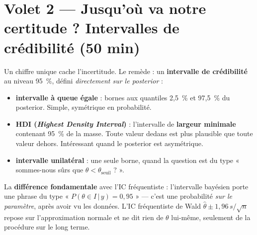 \documentclass[11pt,a4paper]{article}
\newcommand{\given}{\,\vert\,}
\begin{document}
\section{Volet 2 --- Jusqu'où va notre certitude ? Intervalles de crédibilité (50 min)}

\begin{rappel}
Un chiffre unique cache l'incertitude. Le remède : un \textbf{intervalle de
crédibilité} au niveau 95~\%, défini \emph{directement sur le posterior} :
\begin{itemize}[leftmargin=4mm, itemsep=0.5mm]
  \item \textbf{intervalle à queue égale} : bornes aux quantiles 2,5~\% et
        97,5~\% du posterior. Simple, symétrique en probabilité.
  \item \textbf{HDI (\emph{Highest Density Interval})} : l'intervalle de
        \textbf{largeur minimale} contenant 95~\% de la masse. Toute valeur
        dedans est plus plausible que toute valeur dehors. Intéressant quand
        le posterior est asymétrique.
  \item \textbf{intervalle unilatéral} : une seule borne, quand la question est
        du type « sommes-nous sûrs que $\theta < \theta_{\text{seuil}}$ ? ».
\end{itemize}
La \textbf{différence fondamentale} avec l'IC fréquentiste : l'intervalle
bayésien porte une phrase du type « $P(\theta \in I \given y) = 0{,}95$ » ---
c'est une probabilité \emph{sur le paramètre}, après avoir vu les données.
L'IC fréquentiste de Wald $\hat\theta \pm 1{,}96\,s/\sqrt{n}$ repose sur
l'approximation normale et ne dit rien de $\theta$ lui-même, seulement
de la procédure sur le long terme.
\end{rappel}
\end{document}

